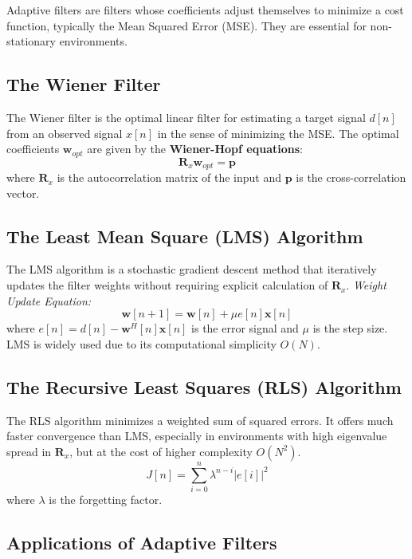 
Adaptive filters are filters whose coefficients adjust themselves to minimize a cost function, typically the Mean Squared Error (MSE). They are essential for non-stationary environments.

\subsection{The Wiener Filter}
The Wiener filter is the optimal linear filter for estimating a target signal $d[n]$ from an observed signal $x[n]$ in the sense of minimizing the MSE. The optimal coefficients $\mathbf{w}_{opt}$ are given by the \textbf{Wiener-Hopf equations}:
\begin{equation}
    \mathbf{R}_x \mathbf{w}_{opt} = \mathbf{p}
\end{equation}
where $\mathbf{R}_x$ is the autocorrelation matrix of the input and $\mathbf{p}$ is the cross-correlation vector.

\subsection{The Least Mean Square (LMS) Algorithm}
The LMS algorithm is a stochastic gradient descent method that iteratively updates the filter weights without requiring explicit calculation of $\mathbf{R}_x$.
\textit{Weight Update Equation:}
\begin{equation}
    \mathbf{w}[n+1] = \mathbf{w}[n] + \mu e[n] \mathbf{x}[n]
\end{equation}
where $e[n] = d[n] - \mathbf{w}^H[n]\mathbf{x}[n]$ is the error signal and $\mu$ is the step size. LMS is widely used due to its computational simplicity $O(N)$.

\subsection{The Recursive Least Squares (RLS) Algorithm}
The RLS algorithm minimizes a weighted sum of squared errors. It offers much faster convergence than LMS, especially in environments with high eigenvalue spread in $\mathbf{R}_x$, but at the cost of higher complexity $O(N^2)$.
\begin{equation}
    J[n] = \sum_{i=0}^{n} \lambda^{n-i} |e[i]|^2
\end{equation}
where $\lambda$ is the forgetting factor.

\subsection{Applications of Adaptive Filters}
